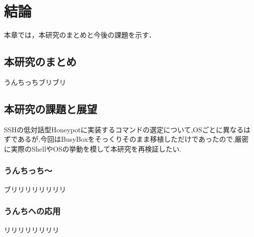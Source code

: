 \chapter{結論}
\label{conc}

本章では，本研究のまとめと今後の課題を示す．

\section{本研究のまとめ}

うんちっちブリブリ

\section{本研究の課題と展望}
SSHの低対話型Honeypotに実装するコマンドの選定について,OSごとに異なるはずであるが,今回はBusyBoxをそっくりそのまま移植しただけであったので,厳密に実際のShellやOSの挙動を模して本研究を再検証したい.

\subsection{うんちっち〜}

ブリリリリリリリリ

\subsection{うんちへの応用}

リリリリリリリリ

